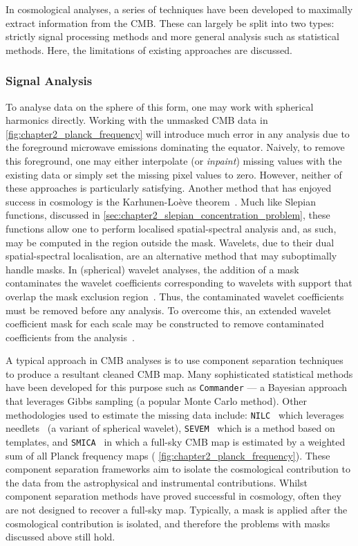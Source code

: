 In cosmological analyses, a series of techniques have been developed to maximally extract information from the CMB\@.
These can largely be split into two types: strictly signal processing methods and more general analysis such as statistical methods.
Here, the limitations of existing approaches are discussed.

\subsubsection{Signal Analysis}\label{sec:chapter2_signal_analysis}

To analyse data on the sphere of this form, one may work with spherical harmonics directly.
Working with the unmasked CMB data in \cref{fig:chapter2_planck_frequency} will introduce much error in any analysis due to the foreground microwave emissions dominating the equator.
Naively, to remove this foreground, one may either interpolate (or \emph{inpaint}) missing values with the existing data or simply set the missing pixel values to zero.
However, neither of these approaches is particularly satisfying.
Another method that has enjoyed success in cosmology is the Karhunen-Loève theorem~\cite{Tegmark1997,Bond1994,Bunn1995}.
Much like Slepian functions, discussed in \cref{sec:chapter2_slepian_concentration_problem}, these functions allow one to perform localised spatial-spectral analysis and, as such, may be computed in the region outside the mask.
Wavelets, due to their dual spatial-spectral localisation, are an alternative method that may suboptimally handle masks.
In (spherical) wavelet analyses, the addition of a mask contaminates the wavelet coefficients corresponding to wavelets with support that overlap the mask exclusion region~\cite{Vielva2004,McEwen2004}.
Thus, the contaminated wavelet coefficients must be removed before any analysis.
To overcome this, an extended wavelet coefficient mask for each scale may be constructed to remove contaminated coefficients from the analysis~\cite{McEwen2007a}.

A typical approach in CMB analyses is to use component separation techniques to produce a resultant cleaned CMB map.
Many sophisticated statistical methods have been developed for this purpose such as \texttt{Commander} --- a Bayesian approach that leverages Gibbs sampling (a popular Monte Carlo method).
Other methodologies used to estimate the missing data include: \texttt{NILC}~\cite{Basak2011,Basak2013,Planck2016,Planck2020a} which leverages needlets~\cite{Narcowich2006} (a variant of spherical wavelet), \texttt{SEVEM}~\cite{Leach2008,FernandezCobos2012,Planck2016,Planck2020a} which is a method based on templates, and \texttt{SMICA}~\cite{Cardoso2008,Planck2016,Planck2020a} in which a full-sky CMB map is estimated by a weighted sum of all Planck frequency maps (\cf{} \cref{fig:chapter2_planck_frequency}).
These component separation frameworks aim to isolate the cosmological contribution to the data from the astrophysical and instrumental contributions.
Whilst component separation methods have proved successful in cosmology, often they are not designed to recover a full-sky map.
Typically, a mask is applied after the cosmological contribution is isolated, and therefore the problems with masks discussed above still hold.

